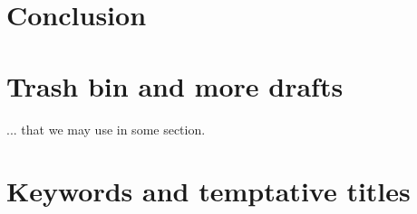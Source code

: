 \documentclass[12pt]{book}
\begin{document}
%
%

\chapter*{Conclusion}
\label{chp:ccl}
\todo{}

%
%

\printbibliography[heading=bibintoc]

%
%

\setcounter{chapter}{-1}
\chapter{Trash bin and more drafts}
... that we may use in some section.
\vfill\minitoc\newpage

\newpage
\newpage
\newpage

%
%

\setcounter{chapter}{-1}


\setcounter{chapter}{-1}
\chapter{Keywords and temptative titles}

\end{document}
